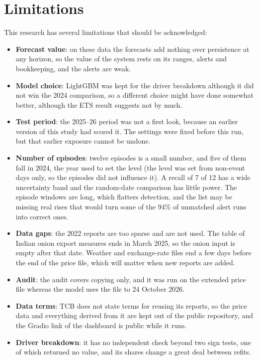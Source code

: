 \documentclass[12pt]{report}
\begin{document}
\section{Limitations}
This research has several limitations that should be acknowledged:
\begin{itemize}
    \item \textbf{Forecast value}: on these data the forecasts add nothing over persistence at any horizon, so the value of the system rests on its ranges, alerts and bookkeeping, and the alerts are weak.
    \item \textbf{Model choice}: LightGBM was kept for the driver breakdown although it did not win the 2024 comparison, so a different choice might have done somewhat better, although the ETS result suggests not by much.
    \item \textbf{Test period}: the 2025--26 period was not a first look, because an earlier version of this study had scored it. The settings were fixed before this run, but that earlier exposure cannot be undone.
    \item \textbf{Number of episodes}: twelve episodes is a small number, and five of them fall in 2024, the year used to set the level (the level was set from non-event days only, so the episodes did not influence it). A recall of 7 of 12 has a wide uncertainty band and the random-date comparison has little power. The episode windows are long, which flatters detection, and the list may be missing real rises that would turn some of the 94\% of unmatched alert runs into correct ones.
    \item \textbf{Data gaps}: the 2022 reports are too sparse and are not used. The table of Indian onion export measures ends in March 2025, so the onion input is empty after that date. Weather and exchange-rate files end a few days before the end of the price file, which will matter when new reports are added.
    \item \textbf{Audit}: the audit covers copying only, and it was run on the extended price file whereas the model uses the file to 24 October 2026.
    \item \textbf{Data terms}: TCB does not state terms for reusing its reports, so the price data and everything derived from it are kept out of the public repository, and the Gradio link of the dashboard is public while it runs.
    \item \textbf{Driver breakdown}: it has no independent check beyond two sign tests, one of which returned no value, and its shares change a great deal between refits.
\end{itemize}
\end{document}
